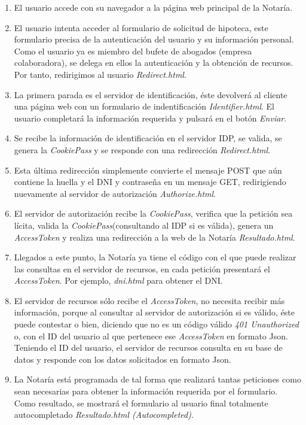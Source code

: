 \documentclass[a4,12pt,onecolum]{article}
\begin{document}
\begin{enumerate}
	\item El usuario accede con su navegador a la página web principal de la Notaría.

	\item El usuario intenta acceder al formulario de solicitud de hipoteca, este formulario precisa de la 			autenticación del usuario y su información personal. Como el usuario ya es miembro del bufete de abogados 		(empresa colaboradora), se delega en ellos la autenticación y la obtención de recursos. Por tanto, 				redirigimos al usuario	\emph{Redirect.html}.

	\item La primera parada es el servidor de identificación, éste devolverá al cliente una página web con un 		formulario de indentificación \emph{Identifier.html}. El usuario completará la información requerida y 			pulsará en el botón \emph{Enviar}.

	\item Se recibe la información de identificación en el servidor IDP, se valida, se genera la 					\emph{CookiePass} y se responde con una redirección \emph{Redirect.html}.

	\item Esta última redirección simplemente convierte el mensaje POST que aún contiene la huella y el DNI y 		contraseña en un mensaje GET, redirigiendo nuevamente al servidor de autorización \emph{Authorize.html}.

	\item El servidor de autorización recibe la \emph{CookiePass}, verifica que la petición sea lícita, valida 		la \emph{CookiePass}(consultando al IDP si es válida), genera un \emph{AccessToken} y realiza una 				redirección a la web de la Notaría \emph{Resultado.html}.

	\item Llegados a este punto, la Notaría ya tiene el código con el que puede realizar las consultas en el 		servidor de recursos, en cada petición presentará el \emph{AccessToken}. Por ejemplo, \emph{dni.html} para 		obtener el DNI.

	\item El servidor de recursos sólo recibe el \emph{AccessToken}, no necesita recibir más información, 			porque al consultar al servidor de autorización si es válido, éste puede contestar o bien, diciendo que no 		es un código válido \emph{401 Unauthorized} o, con el ID del usuario al que pertenece ese 						\emph{AccessToken} en formato Json. Teniendo el ID del usuario, el servidor de recursos consulta en su base 	de datos y responde con los datos solicitados en formato Json.

	\item La Notaría está programada de tal forma que realizará tantas peticiones como sean necesarias para 		obtener la información requerida por el formulario. Como resultado, se mostrará el formulario al usuario 		final totalmente autocompletado \emph{Resultado.html (Autocompleted)}.


\end{enumerate}
\end{document}
